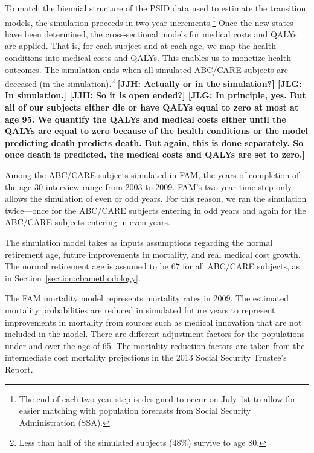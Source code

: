 \noindent To match the biennial structure of the PSID data used to estimate the transition models, the simulation proceeds in two-year increments.\footnote{The end of each two-year step is designed to occur on July 1st to allow for easier matching with population forecasts from Social Security Administration (SSA).}
Once the new states have been determined, the cross-sectional models for medical costs and QALYs are applied. That is, for each subject and at each age, we map the health conditions into medical costs and QALYs. This enables us to monetize health outcomes. The simulation ends when all simulated ABC/CARE subjects are deceased (in the simulation).\footnote{Less than half of the simulated subjects (48\%) survive to age 80.} \textbf{[JJH: Actually or in the simulation?] [JLG: In simulation.] [JJH: So it is open ended?] [JLG: In principle, yes. But all of our subjects either die or have QALYs equal to zero at most at age 95. We quantify the QALYs and medical costs either until the QALYs are equal to zero because of the health conditions or the model predicting death predicts death. But again, this is done separately. So once death is predicted, the medical costs and QALYs are set to zero.]}

\noindent Among the ABC/CARE subjects simulated in FAM, the years of completion of the age-30 interview range from 2003 to 2009. FAM's two-year time step only allows the simulation of even or odd years. For this reason, we ran the simulation twice---once for the ABC/CARE subjects entering in odd years and again for the ABC/CARE subjects entering in even years.

\noindent The simulation model takes as inputs assumptions regarding the normal retirement age, future improvements in mortality, and real medical cost growth. The normal retirement age is assumed to be 67 for all ABC/CARE subjects, as in Section~\ref{section:cbamethodology}.

\noindent The FAM mortality model represents mortality rates in 2009. The estimated mortality probabilities are reduced in simulated future years to represent improvements in mortality from sources such as medical innovation that are not included in the model. There are different adjustment factors for the populations under and over the age of 65. The mortality reduction factors are taken from the intermediate cost mortality projections in the 2013 Social Security Trustee's Report.

